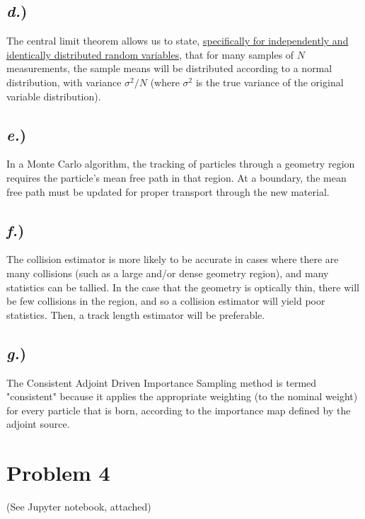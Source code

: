 \documentclass{article}
\begin{document}
\subsection*{\textit{d.})}
The central limit theorem allows us to state, \underline{specifically for independently and identically distributed random variables}, that for many samples of $N$ measurements, the sample means will be distributed according to a normal distribution, with variance $\sigma^2/N$ (where $\sigma^2$ is the true variance of the original variable distribution).

\subsection*{\textit{e.})}
In a Monte Carlo algorithm, the tracking of particles through a geometry region requires the particle's mean free path in that region. At a boundary, the mean free path must be updated for proper transport through the new material. 

\subsection*{\textit{f.})}
The collision estimator is more likely to be accurate in cases where there are many collisions (such as a large and/or dense geometry region), and many statistics can be tallied. In the case that the geometry is optically thin, there will be few collisions in the region, and so a collision estimator will yield poor statistics. Then, a track length estimator will be preferable.

\subsection*{\textit{g.})}
The Consistent Adjoint Driven Importance Sampling method is termed "consistent" because it applies the appropriate weighting (to the nominal weight) for every particle that is born, according to the importance map defined by the adjoint source.




\section*{Problem 4}

(See Jupyter notebook, attached)






\end{document}
